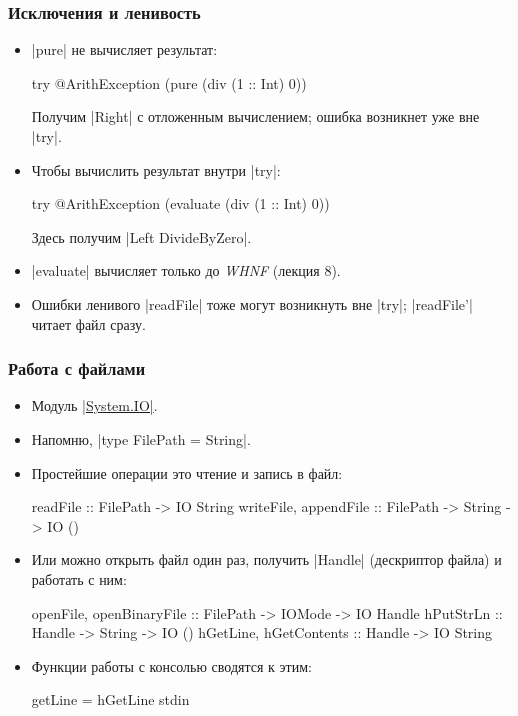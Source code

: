 \documentclass[11pt]{beamer}
\begin{document}
\begin{frame}[fragile]
  \frametitle{Исключения и ленивость}
  \begin{itemize}
    \item \haskinline|pure| не вычисляет результат:
          \begin{haskellsmall}
            try @ArithException (pure (div (1 :: Int) 0))
          \end{haskellsmall}
          Получим \haskinline|Right| с отложенным вычислением; ошибка возникнет уже вне \haskinline|try|.
          \pause
    \item Чтобы вычислить результат внутри \haskinline|try|:
          \begin{haskellsmall}
            try @ArithException (evaluate (div (1 :: Int) 0))
          \end{haskellsmall}
          Здесь получим \haskinline|Left DivideByZero|.
    \item \haskinline|evaluate| вычисляет только до \emph{WHNF} (лекция 8).
    \item Ошибки ленивого \haskinline|readFile| тоже могут возникнуть вне \haskinline|try|; \haskinline|readFile'| читает файл сразу.
  \end{itemize}
\end{frame}

\begin{frame}[fragile]
  \frametitle{Работа с файлами}
  \begin{itemize}
    \item Модуль \href{https://hackage.haskell.org/package/base/docs/System-IO.html}{\haskinline|System.IO|}.
    \item Напомню, \haskinline|type FilePath = String|.
    \item Простейшие операции это чтение и запись в файл:
          \begin{haskell}
            readFile :: FilePath -> IO String
            writeFile, appendFile :: 
              FilePath -> String -> IO ()
          \end{haskell}
    \item
          Или можно открыть файл один раз, получить \haskinline|Handle| (дескриптор файла) и работать с ним:
          \begin{haskell}
            openFile, openBinaryFile :: 
              FilePath -> IOMode -> IO Handle 
            hPutStrLn :: Handle -> String -> IO ()
            hGetLine, hGetContents :: Handle -> IO String
          \end{haskell}
          \pause
    \item
          Функции работы с консолью сводятся к этим:
          \begin{haskell}
            getLine = hGetLine stdin
          \end{haskell}
  \end{itemize}
\end{frame}
\end{document}
